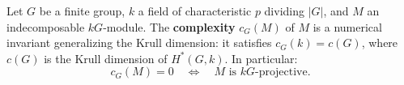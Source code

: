 Let $G$ be a finite group, $k$ a field of characteristic $p$ dividing $|G|$, and $M$ an indecomposable $kG$-module. The \textbf{complexity} $c_G(M)$ of $M$ is a numerical invariant generalizing the Krull dimension: it satisfies $c_G(k) = c(G)$, where $c(G)$ is the Krull dimension of $H^*(G, k)$. In particular:
$$c_G(M) = 0 \quad \Longleftrightarrow \quad M \text{ is } kG\text{-projective}.$$
